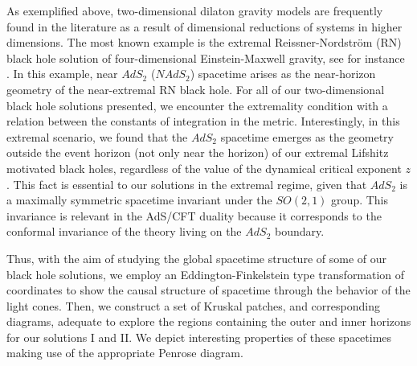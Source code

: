 \documentclass[sn-mathphys,Numbered]{sn-jnl}%
\theoremstyle{thmstyleone}%
\theoremstyle{thmstyletwo}%
\theoremstyle{thmstylethree}%
\begin{document}
As exemplified above, two-dimensional dilaton gravity models are frequently found in the literature as a result of dimensional reductions of systems in higher dimensions. The most known example is the extremal Reissner-Nordstr\"{o}m (RN) black hole solution of four-dimensional Einstein-Maxwell gravity, see for instance \cite{Stanford}. In this example, near $AdS_2$ ($N AdS_2$) spacetime arises as the near-horizon geometry of the near-extremal RN black hole. For all of our two-dimensional black hole solutions presented, we encounter the extremality condition with a relation  between 
the constants of integration in the metric. Interestingly, in this extremal scenario, we found that the $AdS_2$ spacetime emerges as the geometry outside the event horizon (not only near the horizon) of our extremal Lifshitz motivated black holes, regardless of the value of the dynamical critical exponent $z$. This fact is essential to our solutions in the extremal regime, given that $AdS_2$ is a maximally symmetric spacetime invariant under the $SO(2, 1)$ group. This invariance is relevant in the AdS/CFT duality because it corresponds to the conformal invariance of the theory living on the $AdS_2$ boundary.

    
    Thus, with the aim of studying the global spacetime structure of some of our black hole solutions, we employ an Eddington-Finkelstein type transformation of coordinates to show the causal structure of spacetime through the behavior of the light cones. Then, we construct a set of Kruskal patches, and corresponding diagrams, adequate to explore the regions containing the outer and inner horizons for our solutions I and II. We depict interesting properties of these spacetimes making use of the appropriate Penrose diagram.
    
    
\end{document}

